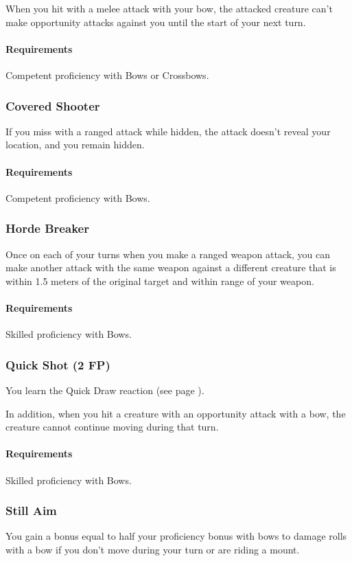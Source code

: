    When you hit with a melee attack with your bow, the attacked creature can't make opportunity attacks against you until the start of your next turn.
    \paragraph{Requirements} Competent proficiency with Bows or Crossbows.
\subsubsection{Covered Shooter} \label{feat::coveredshooter}
    If you miss with a ranged attack while hidden, the attack doesn't reveal your location, and you remain hidden.
    \paragraph{Requirements} Competent proficiency with Bows.
\subsubsection{Horde Breaker} \label{feat::hordebreaker}
    Once on each of your turns when you make a ranged weapon attack, you can make another attack with the same weapon against a different creature that is within 1.5 meters of the original target and within range of your weapon.
    \paragraph{Requirements} Skilled proficiency with Bows.
\subsubsection{Quick Shot (2 FP)} \label{feat::quickshot}
    You learn the Quick Draw reaction (see page \pageref{act::quickdraw}).

    In addition, when you hit a creature with an opportunity attack with a bow, the creature cannot continue moving during that turn.
    \paragraph{Requirements} Skilled proficiency with Bows.
\subsubsection{Still Aim} \label{feat::stillaim}
    You gain a bonus equal to half your proficiency bonus with bows to damage rolls with a bow if you don't move during your turn or are riding a mount.

